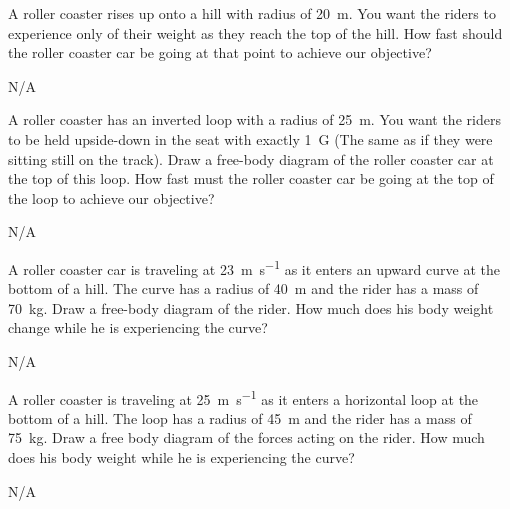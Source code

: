 \begin{question}[ID=centripetal-B-Q01,topic=circular-motion,difficulty=B]
    A roller coaster rises up onto a hill with radius of
        \SI{20}{\meter}.
    You want the riders to experience only 
        of their weight as they reach the top of the hill.
    How fast should the roller coaster car be going at that
        point to achieve our objective?
\end{question}
\begin{solution}
    N/A
\end{solution}


\begin{question}[ID=centripetal-B-Q02,topic=circular-motion,difficulty=B]
    A roller coaster has an inverted loop with a radius
        of \SI{25}{\meter}.
    You want the riders to be held upside-down in the seat
        with exactly \SI{1}{G} (The same as if they were
        sitting still on the track).
    Draw a free-body diagram of the roller coaster car at
        the top of this loop.
    How fast must the roller coaster car be going at the
        top of the loop to achieve our objective?
\end{question}
\begin{solution}
    N/A
\end{solution}


\begin{question}[ID=centripetal-B-Q03,topic=circular-motion,difficulty=B]
    A roller coaster car is traveling at \SI{23}{\meter\per\second}
        as it enters an upward curve at the bottom of a hill.
    The curve has a radius of \SI{40}{\meter} and the rider has a
        mass of \SI{70}{\kilo\gram}.
    Draw a free-body diagram of the rider.
    How much does his body weight change while he is
        experiencing the curve?
\end{question}
\begin{solution}
    N/A
\end{solution}


\begin{question}[ID=centripetal-B-Q04,topic=circular-motion,difficulty=B]
    A roller coaster is traveling at \SI{25}{\meter\per\second}
        as it enters a horizontal loop at the bottom of a hill.
    The loop has a radius of \SI{45}{\meter} and the rider has
        a mass of \SI{75}{\kilo\gram}.
    Draw a free body diagram of the forces acting on the rider.
    How much does his body weight while he is experiencing the
        curve?
\end{question}
\begin{solution}
    N/A
\end{solution}



